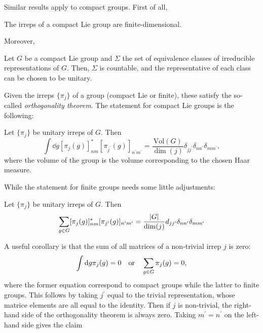 Similar results apply to compact groups.
First of all,

\begin{theorem}
    The irreps of a compact Lie group are finite-dimensional.
\end{theorem}

Moreover,

\begin{theorem}
    Let $G$ be a compact Lie group and $\Sigma$ the set of equivalence classes of irreducible representations of $G$.
    Then, $\Sigma$ is countable, and the representative of each class can be chosen to be unitary.
\end{theorem}

Given the irreps $\{\pi_j\}$ of a group (compact Lie or finite), these satisfy the so-called \emph{orthogonality theorem}.
The statement for compact Lie groups is the following:

\begin{theorem}\label{th:orthogonality_compact_groups}
    Let $\{\pi_j\}$ be unitary irreps of $G$.
    Then
    \begin{equation}
        \int \dd g [\pi_j(g)]_{nm}^{\ast} [\pi_{j^{\prime}}(g)]_{n^{\prime} m^{\prime}}
        = \frac{\text{Vol}(G)}{\dim(j)} \delta_{j j^{\prime} } \delta_{n n^{\prime}} \delta_{m m^{\prime}},
    \end{equation}
    where the volume of the group is the volume corresponding to the chosen Haar measure.
\end{theorem}

While the statement for finite groups needs some little adjustments:

\begin{theorem}
    Let $\{\pi_j\}$ be unitary irreps of $G$.
    Then
    \begin{equation}
        \sum_{g \in G} [\pi_j(g)]_{nm}^{\ast} [\pi_{j^{\prime}}(g)]_{n^{\prime} m^{\prime}}
        = \frac{\abs{G}}{\dim(j)} d_{j j^{\prime}} \delta_{n n^{\prime}} \delta_{m m^{\prime}}
    \end{equation}
\end{theorem}

A useful corollary is that the sum of all matrices of a non-trivial irrep $j$ is zero:
\begin{equation}
    \int \dd g \pi_j (g) = 0
    \qor
    \sum_{g \in G} \pi_j(g) = 0,
    \label{eq:corollary_orthogonality_th}
\end{equation}
where the former equation correspond to compact groups while the latter to finite groups.
This follows by taking $j^{\prime}$ equal to the trivial representation, whose matrice elements are all equal to the identity.
Then if $j$ is non-trivial, the right-hand side of the orthogonality theorem is always zero.
Taking $m^{\prime} = n^{\prime}$ on the left-hand side gives the claim


